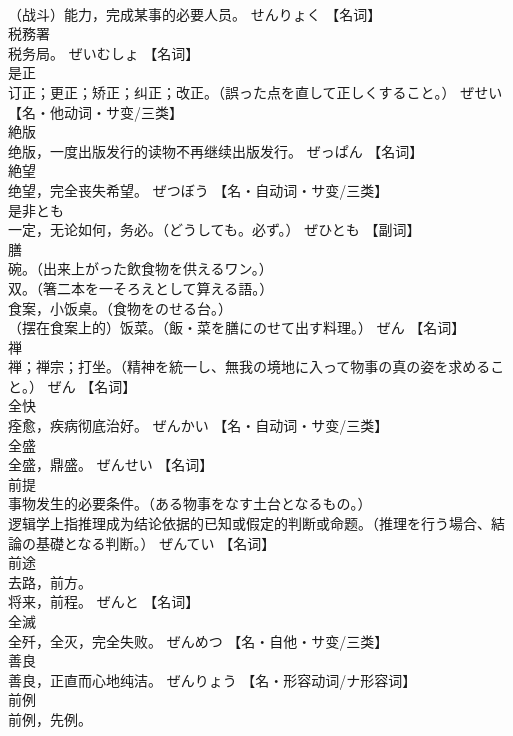 \documentclass[8pt]{extreport}
\begin{document}
\begin{CJK}{UTF8}{min}
\\	（战斗）能力，完成某事的必要人员。	せんりょく		【名词】
\\	税務署	
\\	税务局。	ぜいむしょ		【名词】
\\	是正	
\\	订正；更正；矫正；纠正；改正。（誤った点を直して正しくすること。）	ぜせい		【名・他动词・サ变/三类】
\\	絶版	
\\	绝版，一度出版发行的读物不再继续出版发行。	ぜっぱん		【名词】
\\	絶望	
\\	绝望，完全丧失希望。	ぜつぼう		【名・自动词・サ变/三类】
\\	是非とも	
\\	一定，无论如何，务必。（どうしても。必ず。）	ぜひとも		【副词】
\\	膳	
\\	碗。（出来上がった飲食物を供えるワン。） 
\\	双。（箸二本を一そろえとして算える語。） 
\\	食案，小饭桌。（食物をのせる台。） 
\\	（摆在食案上的）饭菜。（飯・菜を膳にのせて出す料理。）	ぜん		【名词】
\\	禅	
\\	禅；禅宗；打坐。（精神を統一し、無我の境地に入って物事の真の姿を求めること。）	ぜん		【名词】
\\	全快	
\\	痊愈，疾病彻底治好。	ぜんかい		【名・自动词・サ变/三类】
\\	全盛	
\\	全盛，鼎盛。	ぜんせい		【名词】
\\	前提	
\\	事物发生的必要条件。（ある物事をなす土台となるもの。） 
\\	逻辑学上指推理成为结论依据的已知或假定的判断或命题。（推理を行う場合、結論の基礎となる判断。）	ぜんてい		【名词】
\\	前途	
\\	去路，前方。 
\\	将来，前程。	ぜんと		【名词】
\\	全滅	
\\	全歼，全灭，完全失败。	ぜんめつ		【名・自他・サ变/三类】
\\	善良	
\\	善良，正直而心地纯洁。	ぜんりょう		【名・形容动词/ナ形容词】
\\	前例	
\\	前例，先例。 

\end{CJK}
\end{document}
